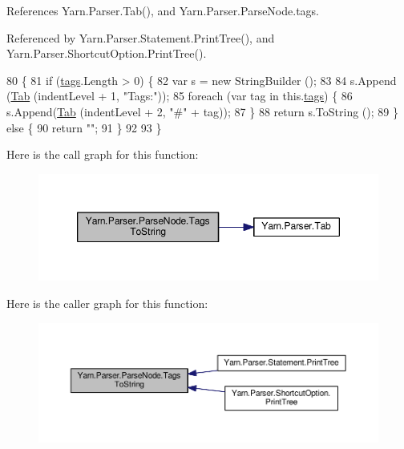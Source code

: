 References Yarn.\-Parser.\-Tab(), and Yarn.\-Parser.\-Parse\-Node.\-tags.



Referenced by Yarn.\-Parser.\-Statement.\-Print\-Tree(), and Yarn.\-Parser.\-Shortcut\-Option.\-Print\-Tree().


\begin{DoxyCode}
80             \{
81                 \textcolor{keywordflow}{if} (\hyperlink{a00150_a58b3a15788fd2d4127d73619dc6d04ae}{tags}.Length > 0) \{
82                     var s = \textcolor{keyword}{new} StringBuilder ();
83 
84                     s.Append (\hyperlink{a00151_aa8fa36b46de12a1c561d77b99c4b9ae3}{Tab} (indentLevel + 1, \textcolor{stringliteral}{"Tags:"}));
85                     \textcolor{keywordflow}{foreach} (var tag \textcolor{keywordflow}{in} this.\hyperlink{a00150_a58b3a15788fd2d4127d73619dc6d04ae}{tags}) \{
86                         s.Append(\hyperlink{a00151_aa8fa36b46de12a1c561d77b99c4b9ae3}{Tab} (indentLevel + 2, \textcolor{stringliteral}{"#"} + tag));
87                     \}
88                     \textcolor{keywordflow}{return} s.ToString ();
89                 \} \textcolor{keywordflow}{else} \{
90                     \textcolor{keywordflow}{return} \textcolor{stringliteral}{""};
91                 \}
92 
93             \}
\end{DoxyCode}


Here is the call graph for this function\-:
\nopagebreak
\begin{figure}[H]
\begin{center}
\leavevmode
\includegraphics[width=350pt]{a00150_a054f36c80d5eeacd569a8859f599af67_cgraph}
\end{center}
\end{figure}




Here is the caller graph for this function\-:
\nopagebreak
\begin{figure}[H]
\begin{center}
\leavevmode
\includegraphics[width=350pt]{a00150_a054f36c80d5eeacd569a8859f599af67_icgraph}
\end{center}
\end{figure}


